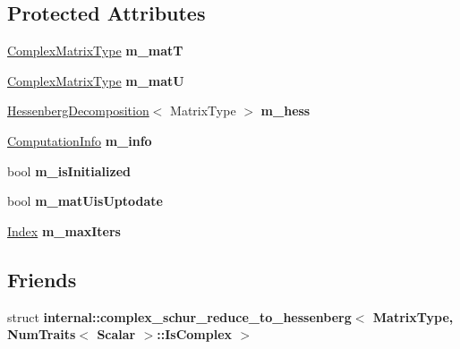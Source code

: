 \subsection*{Protected Attributes}
\begin{DoxyCompactItemize}
\item 
\mbox{\label{class_eigen_1_1_complex_schur_a1ae856aee520ee8fca06376fc7fd8b6a}} 
\mbox{\hyperlink{class_eigen_1_1_complex_schur_af61fe57877d51cfb50178f78534042f0}{Complex\+Matrix\+Type}} {\bfseries m\+\_\+matT}
\item 
\mbox{\label{class_eigen_1_1_complex_schur_a53fefee5d25b8853fbd0b2c4f0873a9a}} 
\mbox{\hyperlink{class_eigen_1_1_complex_schur_af61fe57877d51cfb50178f78534042f0}{Complex\+Matrix\+Type}} {\bfseries m\+\_\+matU}
\item 
\mbox{\label{class_eigen_1_1_complex_schur_afa2fb01289186fe882d7db7f2493b0ec}} 
\mbox{\hyperlink{class_eigen_1_1_hessenberg_decomposition}{Hessenberg\+Decomposition}}$<$ Matrix\+Type $>$ {\bfseries m\+\_\+hess}
\item 
\mbox{\label{class_eigen_1_1_complex_schur_adb18a90a2087d7a89253275d311418c6}} 
\mbox{\hyperlink{group__enums_ga85fad7b87587764e5cf6b513a9e0ee5e}{Computation\+Info}} {\bfseries m\+\_\+info}
\item 
\mbox{\label{class_eigen_1_1_complex_schur_a48e29539f604b170a3e757f5cbeeb818}} 
bool {\bfseries m\+\_\+is\+Initialized}
\item 
\mbox{\label{class_eigen_1_1_complex_schur_a8a6b06445c8c2a10191052880cadb7cd}} 
bool {\bfseries m\+\_\+mat\+Uis\+Uptodate}
\item 
\mbox{\label{class_eigen_1_1_complex_schur_a2e55a5d20381f8f898872f318d591785}} 
\mbox{\hyperlink{class_eigen_1_1_complex_schur_a652104d13723a5b1db2937866a034557}{Index}} {\bfseries m\+\_\+max\+Iters}
\end{DoxyCompactItemize}
\subsection*{Friends}
\begin{DoxyCompactItemize}
\item 
\mbox{\label{class_eigen_1_1_complex_schur_ad25f2162da857c1114ed0383648a7728}} 
struct {\bfseries internal\+::complex\+\_\+schur\+\_\+reduce\+\_\+to\+\_\+hessenberg$<$ Matrix\+Type, Num\+Traits$<$ Scalar $>$\+::\+Is\+Complex $>$}
\end{DoxyCompactItemize}


